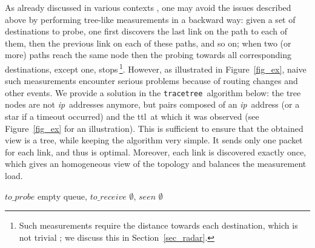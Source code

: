 \documentclass[times, 10pt,twocolumn]{article}
\newcommand{\tracetree}{{\tt trace\-tree}}
\newcommand{\ip}{\mbox{\em \sc ip}}
\newcommand{\ttl}{\mbox{\sc ttl}}
\begin{document}
As already discussed in various contexts
\cite{DTJSAC,DTSigmetrics,probingScheme,pansiot2007multicast,streamlining,scriptroute},
one may avoid the issues described
above by performing tree-like measurements in a backward way: given a
set of destinations to probe, one first discovers the last link on the
path to each of them, then the previous link on each of these paths,
and so on; when two (or more) paths reach the same node then the
probing towards all corresponding destinations, except one,
stops\,\footnote{Such measurements require the distance towards each
  destination, which is not trivial \cite{streamlining}; we discuss
  this in Section~\ref{sec_radar}.}.  However, as illustrated in
Figure~\ref{fig_ex}, naive such measurements encounter serious
problems because of routing changes and other events.
We provide a solution in
the \tracetree\ algorithm below: the tree nodes are not \ip\ addresses
anymore, but pairs composed of an \ip\ address (or a
star if a timeout occurred) and the \ttl\ at which it was observed
(see Figure~\ref{fig_ex} for an illustration). This is sufficient to
ensure that the obtained view is a tree, while keeping the algorithm
very simple. It sends only one packet for each link, and
thus is optimal.
Moreover, each link is discovered exactly
once, which gives an homogeneous view of the topology and balances the
measurement load.

\begin{algorithm}[H]
\caption{\tracetree\ algorithm.}
\dontprintsemicolon
{}
$to\_probe$ \Gets empty queue,
$to\_receive$ \Gets $\emptyset$,
$seen$ \Gets $\emptyset$\;
\;
\label{algo_tracetree}
\end{algorithm}
\end{document}
